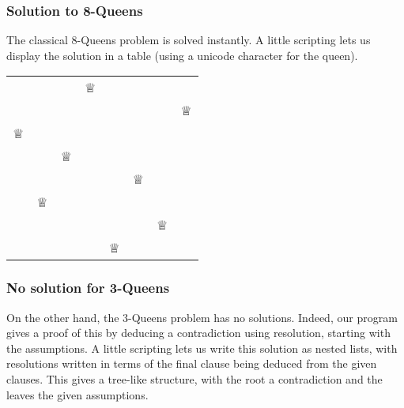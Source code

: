 \hypertarget{solution-to-8-queens}{%
\subsubsection{Solution to 8-Queens}\label{solution-to-8-queens}}

The classical 8-Queens problem is solved instantly. A little scripting
lets us display the solution in a table (using a unicode character for
the queen).

\begin{longtable}[]{@{}llllllll@{}}
\toprule
\endhead
& & & ♕ & & & &\tabularnewline
& & & & & & & ♕\tabularnewline
♕ & & & & & & &\tabularnewline
& & ♕ & & & & &\tabularnewline
& & & & & ♕ & &\tabularnewline
& ♕ & & & & & &\tabularnewline
& & & & & & ♕ &\tabularnewline
& & & & ♕ & & &\tabularnewline
\bottomrule
\end{longtable}

\hypertarget{no-solution-for-3-queens}{%
\subsubsection{No solution for
3-Queens}\label{no-solution-for-3-queens}}

On the other hand, the 3-Queens problem has no solutions. Indeed, our
program gives a proof of this by deducing a contradiction using
resolution, starting with the assumptions. A little scripting lets us
write this solution as nested lists, with resolutions written in terms
of the final clause being deduced from the given clauses. This gives a
tree-like structure, with the root a contradiction and the leaves the
given assumptions.

